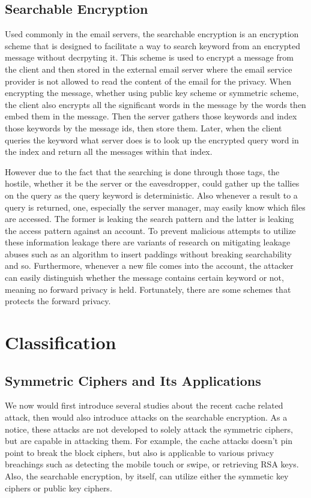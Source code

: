 \documentclass[a4paper]{article}
\begin{document}
\subsection{Searchable Encryption}

Used commonly in the email servers, the searchable encryption is an encryption scheme that is designed to facilitate a way to search keyword from an encrypted message without decrpyting it. This scheme is used to encrypt a message from the client and then stored in the external email server where the email service provider is not allowed to read the content of the email for the privacy. When encrypting the message, whether using public key scheme or symmetric scheme, the client also encrypts all the significant words in the message by the words then embed them in the message. Then the server gathers those keywords and index those keywords by the message ids, then store them. Later, when the client queries the keyword what server does is to look up the encrypted query word in the index and return all the messages within that index.
\par However due to the fact that the searching is done through those tags, the hostile, whether it be the server or the eavesdropper, could gather up the tallies on the query as the query keyword is deterministic. Also whenever a result to a query is returned, one, especially the server manager, may easily know which files are accessed. The former is leaking the search pattern and the latter is leaking the access pattern against an account. To prevent malicious attempts to utilize these information leakage there are variants of research on mitigating leakage abuses such as an algorithm to insert paddings without breaking searchability and so. Furthermore, whenever a new file comes into the account, the attacker can easily distinguish whether the message contains certain keyword or not, meaning no forward privacy is held. Fortunately, there are some schemes that protects the forward privacy.

\section{Classification}

\subsection{Symmetric Ciphers and Its Applications}

We now would first introduce several studies about the recent cache related attack, then would also introduce attacks on the searchable encryption. As a notice, these attacks are not developed to solely attack the symmetric ciphers, but are capable in attacking them. For example, the cache attacks doesn't pin point to break the block ciphers, but also is applicable to various privacy breachings such as detecting the mobile touch or swipe, or retrieving RSA keys. Also, the searchable encryption, by itself, can utilize either the symmetic key ciphers or public key ciphers.
\end{document}
